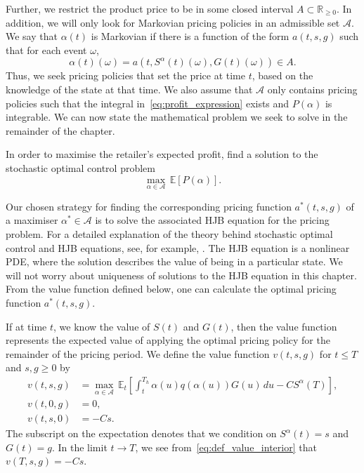 \documentclass[main.tex]{subfiles}
\begin{document}
Further, we restrict the product price to be in some closed  interval
$A\subset\mathbb{R}_{\geq 0}$.
In addition, we will only look for Markovian pricing policies in an
admissible set $\mathcal{A}$. We say that $\alpha(t)$ is Markovian if
there is a function of the form $a(t,s,g)$ such that for each event $\omega$,
\begin{equation}
  \alpha(t)(\omega) = a(t,S^\alpha(t)(\omega), G(t)(\omega)) \in A.
\end{equation}
Thus, we seek pricing policies that set the price at time $t$, based
on the knowledge of the state at that time. We also assume that
$\mathcal{A}$ only contains pricing policies such that the integral
in~\eqref{eq:profit_expression} exists and
$P(\alpha)$ is integrable. We can now state the mathematical problem we
seek to solve in the remainder of the chapter.
\begin{mydef}
  In order to maximise the retailer's expected profit, find a solution to
  the stochastic optimal control problem
  \begin{equation}\label{eq:pricing_problem}
    \max_{\alpha\in \mathcal{A}}\,\mathbb{E}[P(\alpha)].
  \end{equation}
\end{mydef}
Our chosen strategy for finding the corresponding pricing function $a^*(t,s,g)$
of a maximiser $\alpha^*\in\mathcal{A}$ is to solve the associated HJB
equation for the pricing problem.
For a detailed explanation of the theory behind stochastic optimal control and
HJB equations, see, for example, \citet{pham2009continuous}.
The HJB equation is a nonlinear PDE, where the solution describes the
value of being in a particular state. We will not worry about
uniqueness of solutions to the HJB equation in this chapter. From the
value function defined below, one can
calculate the optimal pricing function $a^*(t,s,g)$.

If at time $t$, we know the value of $S(t)$ and $G(t)$, then the value
function represents the expected value of applying the optimal pricing
policy for the remainder of the pricing period.
We define the value function $v(t,s,g)$ for $t \leq T$ and $s,g\geq
0$ by
\begin{align}
  v(t,s,g) &=
             \max_{\alpha \in \mathcal{A}}\,
             \mathbb{E}_{t}\left[
             \int_t^{T_h}\alpha(u)q(\alpha(u))G(u)\,du-CS^\alpha(T)
             \right],\label{eq:def_value_interior}\\
  v(t,0,g)&= 0,\\
  v(t,s,0)&=-Cs.
\end{align}
The subscript on the expectation denotes that we condition on
$S^\alpha(t)=s$ and $G(t)=g$.
In the limit $t\to T$, we see from~\eqref{eq:def_value_interior} that
$v(T,s,g)=-Cs$.
\end{document}
